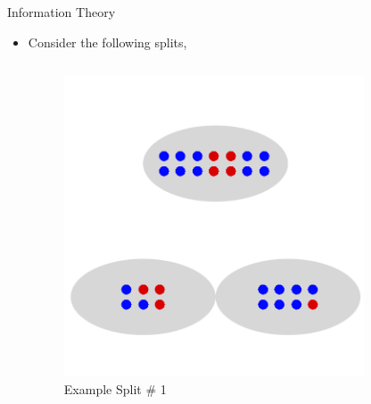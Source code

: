 \documentclass[xcolor={svgnames},
               hyperref={colorlinks,citecolor=DeepPink4,linkcolor=FireBrick,urlcolor=Maroon}]
               {beamer}
\begin{document}
  
  \begin{frame}{Information Theory}
    \begin{itemize}
      \item Consider the following splits,
      \begin{columns}[T]
        \begin{column}{.45\textwidth}
          \begin{figure}
            \vspace*{\fill}
            \begin{center}
          \includegraphics[width=.85\textwidth]{HighEntropy.png}
        \caption{Example Split \# 1}
            \end{center}
            \vspace*{\fill}
          \end{figure}
        \end{column}
        \begin{column}{.45\textwidth}
              \begin{figure}
                \vspace*{\fill}
                \begin{center}

\end{center}
\end{figure}
\end{column}
\end{columns}
\end{itemize}
\end{frame}
\end{document}
